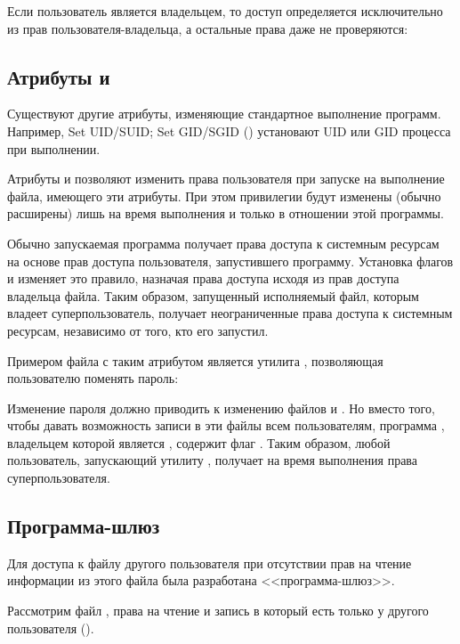Если пользователь является владельцем, то доступ определяется исключительно из прав пользователя-владельца, а остальные права даже не проверяются:


\subsection{Атрибуты  и }

Существуют другие атрибуты, изменяющие стандартное выполнение программ. Например, Set UID/SUID; Set GID/SGID () установают UID или GID процесса при выполнении.

Атрибуты  и  позволяют изменить права пользователя при запуске на выполнение файла, имеющего эти атрибуты. При этом привилегии будут изменены (обычно расширены) лишь на время выполнения и только в отношении этой программы.

Обычно запускаемая программа получает права доступа к системным ресурсам на основе прав доступа пользователя, запустившего программу. Установка флагов  и  изменяет это правило, назначая права доступа исходя из прав доступа владельца файла. Таким образом, запущенный исполняемый файл, которым владеет суперпользователь, получает неограниченные права доступа к системным ресурсам, независимо от того, кто его запустил.

Примером файла с таким атрибутом является утилита , позволяющая пользователю поменять пароль:


Изменение пароля должно приводить к изменению файлов  и . Но вместо того, чтобы давать возможность записи в эти файлы всем пользователям, программа , владельцем которой является , содержит флаг . Таким образом, любой пользователь, запускающий утилиту , получает на время выполнения права суперпользователя.

\newpage

\subsection{Программа-шлюз}

Для доступа к файлу другого пользователя при отсутствии прав на чтение информации из этого файла была разработана <<программа-шлюз>>. 

Рассмотрим файл , права на чтение и запись в который есть только у другого пользователя ().


